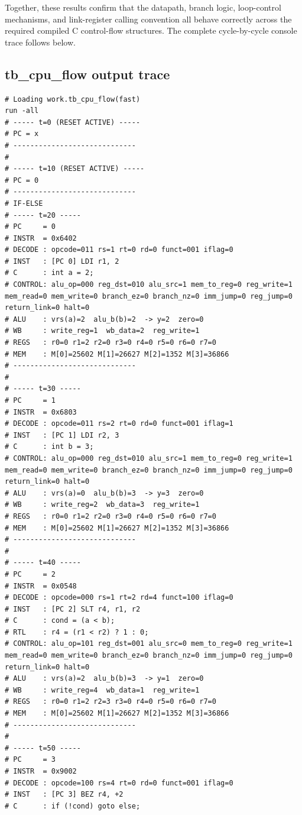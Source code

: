 \documentclass[12pt]{report}
\begin{document}
Together, these results confirm that the datapath, branch logic, loop-control
mechanisms, and link-register calling convention all behave correctly across
the required compiled C control-flow structures.  
The complete cycle-by-cycle console trace follows below.

\subsection*{tb\_cpu\_flow output trace}
\begin{lstlisting}
# Loading work.tb_cpu_flow(fast)
run -all
# ----- t=0 (RESET ACTIVE) -----
# PC = x
# -----------------------------
# 
# ----- t=10 (RESET ACTIVE) -----
# PC = 0
# -----------------------------
# IF-ELSE
# ----- t=20 -----
# PC     = 0
# INSTR  = 0x6402
# DECODE : opcode=011 rs=1 rt=0 rd=0 funct=001 iflag=0
# INST   : [PC 0] LDI r1, 2
# C      : int a = 2;
# CONTROL: alu_op=000 reg_dst=010 alu_src=1 mem_to_reg=0 reg_write=1 mem_read=0 mem_write=0 branch_ez=0 branch_nz=0 imm_jump=0 reg_jump=0 return_link=0 halt=0
# ALU    : vrs(a)=2  alu_b(b)=2  -> y=2  zero=0
# WB     : write_reg=1  wb_data=2  reg_write=1
# REGS   : r0=0 r1=2 r2=0 r3=0 r4=0 r5=0 r6=0 r7=0
# MEM    : M[0]=25602 M[1]=26627 M[2]=1352 M[3]=36866
# -----------------------------
# 
# ----- t=30 -----
# PC     = 1
# INSTR  = 0x6803
# DECODE : opcode=011 rs=2 rt=0 rd=0 funct=001 iflag=1
# INST   : [PC 1] LDI r2, 3
# C      : int b = 3;
# CONTROL: alu_op=000 reg_dst=010 alu_src=1 mem_to_reg=0 reg_write=1 mem_read=0 mem_write=0 branch_ez=0 branch_nz=0 imm_jump=0 reg_jump=0 return_link=0 halt=0
# ALU    : vrs(a)=0  alu_b(b)=3  -> y=3  zero=0
# WB     : write_reg=2  wb_data=3  reg_write=1
# REGS   : r0=0 r1=2 r2=0 r3=0 r4=0 r5=0 r6=0 r7=0
# MEM    : M[0]=25602 M[1]=26627 M[2]=1352 M[3]=36866
# -----------------------------
# 
# ----- t=40 -----
# PC     = 2
# INSTR  = 0x0548
# DECODE : opcode=000 rs=1 rt=2 rd=4 funct=100 iflag=0
# INST   : [PC 2] SLT r4, r1, r2
# C      : cond = (a < b);
# RTL    : r4 = (r1 < r2) ? 1 : 0;
# CONTROL: alu_op=101 reg_dst=001 alu_src=0 mem_to_reg=0 reg_write=1 mem_read=0 mem_write=0 branch_ez=0 branch_nz=0 imm_jump=0 reg_jump=0 return_link=0 halt=0
# ALU    : vrs(a)=2  alu_b(b)=3  -> y=1  zero=0
# WB     : write_reg=4  wb_data=1  reg_write=1
# REGS   : r0=0 r1=2 r2=3 r3=0 r4=0 r5=0 r6=0 r7=0
# MEM    : M[0]=25602 M[1]=26627 M[2]=1352 M[3]=36866
# -----------------------------
# 
# ----- t=50 -----
# PC     = 3
# INSTR  = 0x9002
# DECODE : opcode=100 rs=4 rt=0 rd=0 funct=001 iflag=0
# INST   : [PC 3] BEZ r4, +2
# C      : if (!cond) goto else;

\end{lstlisting}
\end{document}
